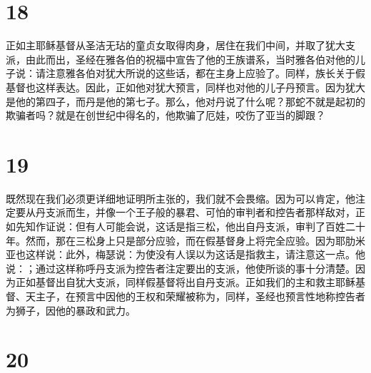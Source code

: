 
\section{18}

正如主耶稣基督从圣洁无玷的童贞女取得肉身，居住在我们中间，并取了犹大支派，由此而出，圣经在雅各伯的祝福中宣告了他的王族谱系，当时雅各伯对他的儿子说：请注意雅各伯对犹大所说的这些话，都在主身上应验了。同样，族长关于假基督也这样表达。因此，正如他对犹大预言，同样也对他的儿子丹预言。因为犹大是他的第四子，而丹是他的第七子。那么，他对丹说了什么呢？那蛇不就是起初的欺骗者吗？就是在创世纪中得名的，他欺骗了厄娃，咬伤了亚当的脚跟？\par


\section{19}

既然现在我们必须更详细地证明所主张的，我们就不会畏缩。因为可以肯定，他注定要从丹支派而生，并像一个王子般的暴君、可怕的审判者和控告者那样敌对，正如先知作证说：但有人可能会说，这话是指三松，他出自丹支派，审判了百姓二十年。然而，那在三松身上只是部分应验，而在假基督身上将完全应验。因为耶肋米亚也这样说：此外，梅瑟说：为使没有人误以为这话是指救主，请注意这一点。他说：；通过这样称呼丹支派为控告者注定要出的支派，他使所谈的事十分清楚。因为正如基督出自犹大支派，同样假基督将出自丹支派。正如我们的主和救主耶稣基督、天主子，在预言中因他的王权和荣耀被称为，同样，圣经也预言性地称控告者为狮子，因他的暴政和武力。\par


\section{20}

